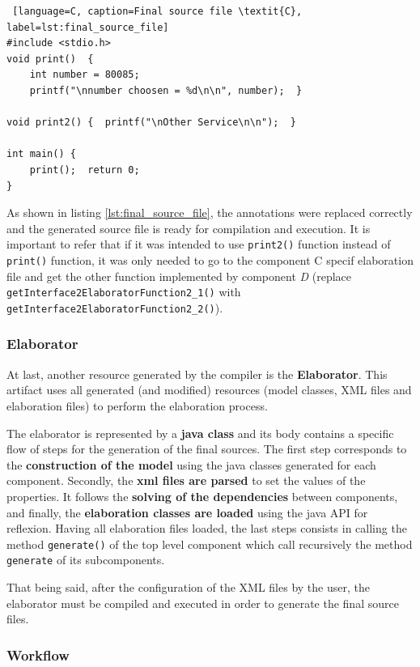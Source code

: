 \begin{lstlisting} [language=C, caption=Final source file \textit{C}, label=lst:final_source_file]
#include <stdio.h>
void print()  {
	int number = 80085;
	printf("\nnumber choosen = %d\n\n", number);  }

void print2() {  printf("\nOther Service\n\n");  }

int main() {
	print();  return 0;  
}
\end{lstlisting}

As shown in listing \ref{lst:final_source_file}, the annotations were replaced correctly and the generated source file is ready for compilation and execution. It is important to refer that if it was intended to use \texttt{print2()} function instead of \texttt{print()} function, it was only needed to go to the component C specif elaboration file and get the other function implemented by component \textit{D} (replace \texttt{getInterface2ElaboratorFunction2\_1()} with \texttt{getInterface2ElaboratorFunction2\_2()}). 


\subsubsection*{Elaborator}

At last, another resource generated by the compiler is the \textbf{Elaborator}. This artifact uses all generated (and modified) resources (model classes, XML files and elaboration files) to perform the elaboration process.

The elaborator is represented by a \textbf{java class} and its body contains a specific flow of steps for the generation of the final sources. The first step corresponds to the \textbf{construction of the model} using the java classes generated for each component. Secondly, the \textbf{xml files are parsed} to set the values of the properties. It follows the \textbf{solving of the dependencies} between components, and finally, the \textbf{elaboration classes are loaded} using the java API for reflexion. Having all elaboration files loaded, the last steps consists in calling the method \texttt{generate()} of the top level component which call recursively the method \texttt{generate} of its subcomponents.

That being said, after the configuration of the XML files by the user, the elaborator must be compiled and executed in order to generate the final source files.


\subsubsection{Workflow}

